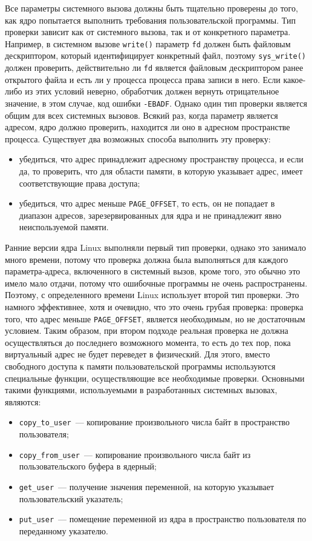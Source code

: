 Все параметры системного вызова должны быть тщательно проверены до того, как
ядро попытается выполнить требования пользовательской программы. Тип проверки
зависит как от системного вызова, так и от конкретного параметра. Например, в
системном вызове \texttt{write()} параметр \texttt{fd} должен быть файловым
дескриптором, который идентифицирует конкретный файл, поэтому
\texttt{sys\_write()} должен проверить, действительно ли \texttt{fd} является
файловым дескриптором ранее открытого файла и есть ли у процесса процесса права
записи в него. Если какое-либо из этих условий неверно, обработчик должен
вернуть отрицательное значение, в этом случае, код ошибки \texttt{-EBADF}.
Однако один тип проверки является общим для всех системных вызовов. Всякий раз,
когда параметр является адресом, ядро должно проверить, находится ли оно в
адресном пространстве процесса. Существует два возможных способа выполнить эту
проверку:
\begin{itemize}
\item убедиться, что адрес принадлежит адресному пространству процесса, и если
  да, то проверить, что для области памяти, в которую указывает адрес, имеет
  соответствующие права доступа;
\item убедиться, что адрес меньше \texttt{PAGE\_OFFSET}, то есть, он не попадает
  в диапазон адресов, зарезервированных для ядра и не принадлежит явно
  неиспользуемой памяти.
\end{itemize}

Ранние версии ядра Linux выполняли первый тип проверки, однако это занимало
много времени, потому что проверка должна была выполняться для каждого
параметра-адреса, включенного в системный вызов, кроме того, это обычно это
имело мало отдачи, потому что ошибочные программы не очень распространены.
Поэтому, с определенного времени Linux использует второй тип проверки. Это
намного эффективнее, хотя и очевидно, что это очень грубая проверка: проверка
того, что адрес меньше \texttt{PAGE\_OFFSET}, является необходимым, но не
достаточным условием. Таким образом, при втором подходе реальная проверка не
должна осуществляться до последнего возможного момента, то есть до тех пор, пока
виртуальный адрес не будет переведет в физический. Для этого, вместо свободного
доступа к памяти пользовательской программы используются специальные функции,
осуществляющие все необходимые проверки. Основными такими функциями,
используемыми в разработанных системных вызовах, являются:
\begin{itemize}
\item \texttt{copy\_to\_user}~--- копирование произвольного числа байт в
  пространство пользователя;
\item \texttt{copy\_from\_user}~--- копирование произвольного числа байт из
  пользовательского буфера в ядерный;
\item \texttt{get\_user}~--- получение значения переменной, на которую указывает
  пользовательский указатель;
\item \texttt{put\_user}~--- помещение переменной из ядра в пространство
  пользователя по переданному указателю.
\end{itemize}


